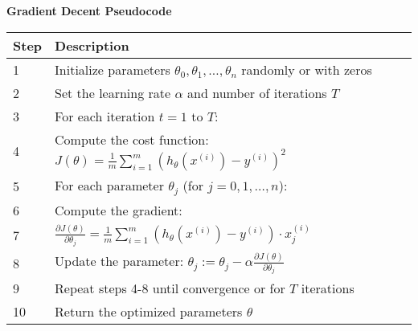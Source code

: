 \documentclass[preview]{standalone}
\begin{document}
\begin{table}[ht]
\centering
\textbf{Gradient Decent Pseudocode} \\
\begin{tabular}{|l|l|}
\textbf{Step} & \textbf{Description} \\
\hline
1 & Initialize parameters $\theta_0, \theta_1, \dots, \theta_n$ randomly or with zeros \\
2 & Set the learning rate $\alpha$ and number of iterations $T$ \\
3 & For each iteration $t = 1$ to $T$: \\
4 & \hspace{1cm} Compute the cost function: $J(\theta) = \frac{1}{m} \sum_{i=1}^{m} \left( h_\theta(x^{(i)}) - y^{(i)} \right)^2$ \\
5 & \hspace{1cm} For each parameter $\theta_j$ (for $j = 0, 1, \dots, n$): \\
6 & \hspace{2cm} Compute the gradient: \\
7 & \hspace{2cm} $\frac{\partial J(\theta)}{\partial \theta_j} = \frac{1}{m} \sum_{i=1}^{m} \left( h_\theta(x^{(i)}) - y^{(i)} \right) \cdot x_j^{(i)}$ \\
8 & \hspace{2cm} Update the parameter: $\theta_j := \theta_j - \alpha \frac{\partial J(\theta)}{\partial \theta_j}$ \\
9 & Repeat steps 4-8 until convergence or for $T$ iterations \\
10 & Return the optimized parameters $\theta$ \\
\hline
\end{tabular}
\end{table}
\end{document}
